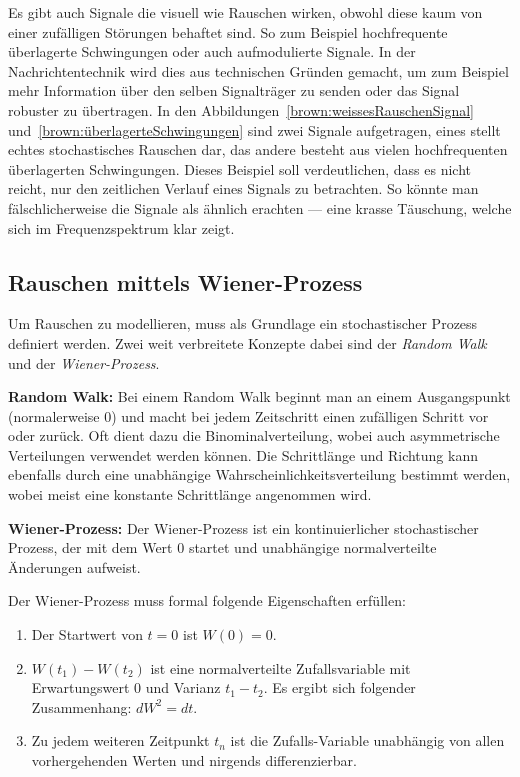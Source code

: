 Es gibt auch Signale die visuell wie Rauschen wirken, obwohl diese kaum von einer zufälligen Störungen behaftet sind. So zum Beispiel hochfrequente überlagerte Schwingungen oder auch aufmodulierte Signale. In der Nachrichtentechnik wird dies aus technischen Gründen gemacht, um zum Beispiel mehr Information über den selben Signalträger zu senden oder das Signal robuster zu übertragen. In den Abbildungen~\ref{brown:weissesRauschenSignal} und~\ref{brown:überlagerteSchwingungen} sind zwei Signale aufgetragen, eines stellt echtes stochastisches Rauschen dar, das andere besteht aus vielen hochfrequenten überlagerten Schwingungen. Dieses Beispiel soll verdeutlichen, dass es nicht reicht, nur den zeitlichen Verlauf eines Signals zu betrachten. So könnte man fälschlicherweise die Signale als ähnlich erachten --- eine krasse Täuschung, welche sich im Frequenzspektrum klar zeigt. 



\subsection{Rauschen mittels Wiener-Prozess\label{brown:Rauschen:RandomWalkWiener}}

Um Rauschen zu modellieren, muss als Grundlage ein stochastischer Prozess definiert werden. Zwei weit verbreitete Konzepte dabei sind der \textit{Random Walk} und der \textit{Wiener-Prozess}.

\begin{definition}\textbf{Random Walk:}
	\label{randomWalk}
	Bei einem Random Walk beginnt man an einem Ausgangspunkt (normalerweise 0) und macht bei jedem Zeitschritt einen zufälligen Schritt vor oder zurück. Oft dient dazu die Binominalverteilung, wobei auch asymmetrische Verteilungen verwendet werden können. Die Schrittlänge und Richtung kann ebenfalls durch eine unabhängige Wahrscheinlichkeitsverteilung bestimmt werden, wobei meist eine konstante Schrittlänge angenommen wird.
\end{definition}

\begin{definition}\textbf{Wiener-Prozess:}
	\label{wienerprozess}
	Der Wiener-Prozess ist ein kontinuierlicher stochastischer Prozess, der mit dem Wert 0 startet und unabhängige normalverteilte Änderungen aufweist.
	
	Der Wiener-Prozess muss formal folgende Eigenschaften erfüllen: 
	
	\begin{enumerate}
		\item Der Startwert von $ t = 0 $ ist $ W(0) = 0 $.
		\item $ W(t_{1}) - W(t_{2}) $ ist eine normalverteilte Zufallsvariable mit Erwartungswert 0 und Varianz $ t_{1} - t_{2} $. Es ergibt sich folgender Zusammenhang: $ dW^2 = dt $.
		\item Zu jedem weiteren Zeitpunkt $ t_{n} $ ist die Zufalls-Variable unabhängig von allen vorhergehenden Werten und nirgends differenzierbar.
	\end{enumerate}
\end{definition}

